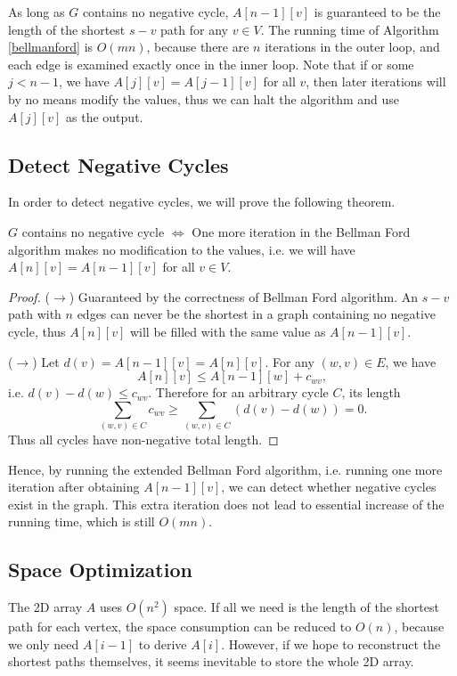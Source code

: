 As long as $G$ contains no negative cycle, $A[n-1][v]$ is guaranteed to be the length of the shortest $s-v$ path for any $v\in V$. The running time of Algorithm \ref{bellmanford} is $O(mn)$, because there are $n$ iterations in the outer loop, and each edge is examined exactly once in the inner loop. Note that if or some $j<n-1$, we have $A[j][v]=A[j-1][v]$ for all $v$, then later iterations will by no means modify the values, thus we can halt the algorithm and use $A[j][v]$ as the output. 
\subsection{Detect Negative Cycles}
In order to detect negative cycles, we will prove the following theorem.
\begin{theorem}
$G$ contains no negative cycle $\iff$ One more iteration in the Bellman Ford algorithm makes no modification to the values, i.e. we will have $A[n][v]=A[n-1][v]$ for all $v\in V$. 
\end{theorem} 
\begin{proof}
($\rightarrow$) Guaranteed by the correctness of Bellman Ford algorithm. An $s-v$ path with $n$ edges can never be the shortest in a graph containing no negative cycle, thus $A[n][v]$ will be filled with the same value as $A[n-1][v]$.

($\rightarrow$) Let $d(v)=A[n-1][v]=A[n][v]$. For any $(w,v)\in E$, we have 
$$A[n][v]\leq A[n-1][w]+c_{wv},$$
i.e. $d(v)-d(w)\leq c_{wv}$. Therefore for an arbitrary cycle $C$, its length
$$\sum\limits_{(w,v)\in C}c_{wv}\geq \sum\limits_{(w,v)\in C}(d(v)-d(w))=0.$$
Thus all cycles have non-negative total length.
\end{proof}

Hence, by running the extended Bellman Ford algorithm, i.e. running one more iteration after obtaining $A[n-1][v]$, we can detect whether negative cycles exist in the graph. This extra iteration does not lead to essential increase of the running time, which is still $O(mn)$. 
\subsection{Space Optimization}
The 2D array $A$ uses $O(n^2)$ space. If all we need is the length of the shortest path for each vertex, the space consumption can be reduced to $O(n)$, because we only need $A[i-1]$ to derive $A[i]$. However, if we hope to reconstruct the shortest paths themselves, it seems inevitable to store the whole 2D array.

